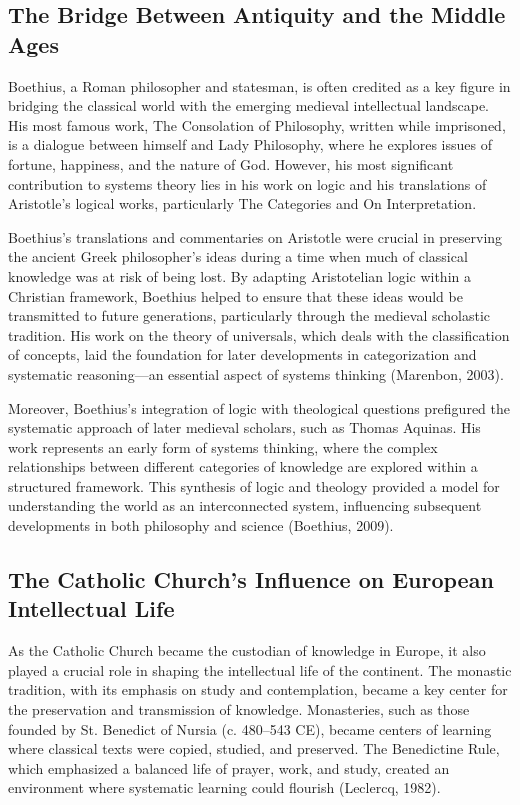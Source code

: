 \documentclass[twocolumn]{article}
\begin{document}
\subsection{The Bridge Between Antiquity and the Middle Ages}

\textcolor{primary}{Boethius, a Roman philosopher and statesman, is often credited as a key figure in bridging the classical world with the emerging medieval intellectual landscape. His most famous work, The Consolation of Philosophy, written while imprisoned, is a dialogue between himself and Lady Philosophy, where he explores issues of fortune, happiness, and the nature of God. However, his most significant contribution to systems theory lies in his work on logic and his translations of Aristotle's logical works, particularly The Categories and On Interpretation.}

\textcolor{secondary}{Boethius’s translations and commentaries on Aristotle were crucial in preserving the ancient Greek philosopher’s ideas during a time when much of classical knowledge was at risk of being lost. By adapting Aristotelian logic within a Christian framework, Boethius helped to ensure that these ideas would be transmitted to future generations, particularly through the medieval scholastic tradition. His work on the theory of universals, which deals with the classification of concepts, laid the foundation for later developments in categorization and systematic reasoning—an essential aspect of systems thinking (Marenbon, 2003).}

\textcolor{primary}{Moreover, Boethius’s integration of logic with theological questions prefigured the systematic approach of later medieval scholars, such as Thomas Aquinas. His work represents an early form of systems thinking, where the complex relationships between different categories of knowledge are explored within a structured framework. This synthesis of logic and theology provided a model for understanding the world as an interconnected system, influencing subsequent developments in both philosophy and science (Boethius, 2009).}

\subsection{The Catholic Church’s Influence on European Intellectual Life}

\textcolor{primary}{As the Catholic Church became the custodian of knowledge in Europe, it also played a crucial role in shaping the intellectual life of the continent. The monastic tradition, with its emphasis on study and contemplation, became a key center for the preservation and transmission of knowledge. Monasteries, such as those founded by St. Benedict of Nursia (c. 480–543 CE), became centers of learning where classical texts were copied, studied, and preserved. The Benedictine Rule, which emphasized a balanced life of prayer, work, and study, created an environment where systematic learning could flourish (Leclercq, 1982).}
\end{document}
